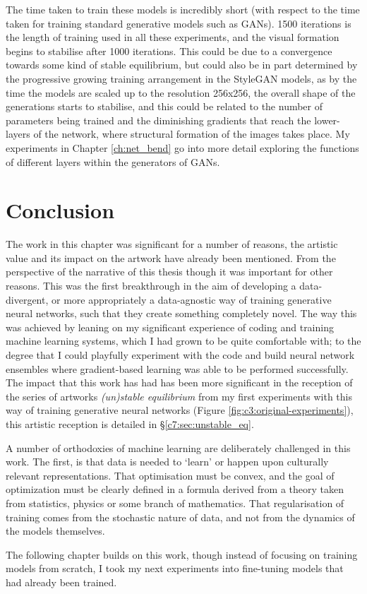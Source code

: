 The time taken to train these models is incredibly short (with respect to the time taken for training standard generative models such as GANs). 
1500 iterations is the length of training used in all these experiments, and the visual formation begins to stabilise after 1000 iterations. 
This could be due to a convergence towards some kind of stable equilibrium, but could also be in part determined by the progressive growing training arrangement in the StyleGAN models, as by the time the models are scaled up to the resolution 256x256, the overall shape of the generations starts to stabilise, and this could be related to the number of parameters being trained and the diminishing gradients that reach the lower-layers of the network, where structural formation of the images takes place.
My experiments in Chapter \ref{ch:net_bend} go into more detail exploring the functions of different layers within the generators of GANs. 


\section{Conclusion}

The work in this chapter was significant for a number of reasons, the artistic value and its impact on the artwork have already been mentioned. 
From the perspective of the narrative of this thesis though it was important for other reasons. 
This was the first breakthrough in the aim of developing a data-divergent, or more appropriately a data-agnostic way of training generative neural networks, such that they create something completely novel. 
The way this was achieved by leaning on my significant experience of coding and training machine learning systems, which I had grown to be quite comfortable with; to the degree that I could playfully experiment with the code and build neural network ensembles where gradient-based learning was able to be performed successfully.
The impact that this work has had has been more significant in the reception of the series of artworks \textit{(un)stable equilibrium} from my first experiments with this way of training generative neural networks (Figure \ref{fig:c3:original-experiments}), this artistic reception is detailed in \S \ref{c7:sec:unstable_eq}.

A number of orthodoxies of machine learning are deliberately challenged in this work. 
The first, is that data is needed to ‘learn’ or happen upon culturally relevant representations. That optimisation must be convex, and the goal of optimization must be clearly defined in a formula derived from a theory taken from statistics, physics or some branch of mathematics. 
That regularisation of training comes from the stochastic nature of data, and not from the dynamics of the models themselves. 

The following chapter builds on this work, though instead of focusing on training models from scratch, I took my next experiments into fine-tuning models that had already been trained.
